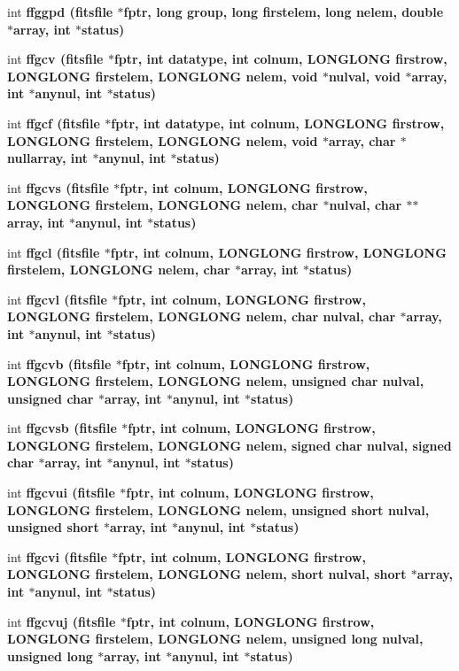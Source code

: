 \begin{CompactItemize}
\item 
int \bf{ffggpd} (\bf{fitsfile} $\ast$fptr, long group, long firstelem, long nelem, double $\ast$array, int $\ast$status)
\item 
int \bf{ffgcv} (\bf{fitsfile} $\ast$fptr, int \bf{datatype}, int colnum, \bf{LONGLONG} firstrow, \bf{LONGLONG} firstelem, \bf{LONGLONG} nelem, void $\ast$nulval, void $\ast$array, int $\ast$anynul, int $\ast$status)
\item 
int \bf{ffgcf} (\bf{fitsfile} $\ast$fptr, int \bf{datatype}, int colnum, \bf{LONGLONG} firstrow, \bf{LONGLONG} firstelem, \bf{LONGLONG} nelem, void $\ast$array, char $\ast$nullarray, int $\ast$anynul, int $\ast$status)
\item 
int \bf{ffgcvs} (\bf{fitsfile} $\ast$fptr, int colnum, \bf{LONGLONG} firstrow, \bf{LONGLONG} firstelem, \bf{LONGLONG} nelem, char $\ast$nulval, char $\ast$$\ast$array, int $\ast$anynul, int $\ast$status)
\item 
int \bf{ffgcl} (\bf{fitsfile} $\ast$fptr, int colnum, \bf{LONGLONG} firstrow, \bf{LONGLONG} firstelem, \bf{LONGLONG} nelem, char $\ast$array, int $\ast$status)
\item 
int \bf{ffgcvl} (\bf{fitsfile} $\ast$fptr, int colnum, \bf{LONGLONG} firstrow, \bf{LONGLONG} firstelem, \bf{LONGLONG} nelem, char nulval, char $\ast$array, int $\ast$anynul, int $\ast$status)
\item 
int \bf{ffgcvb} (\bf{fitsfile} $\ast$fptr, int colnum, \bf{LONGLONG} firstrow, \bf{LONGLONG} firstelem, \bf{LONGLONG} nelem, unsigned char nulval, unsigned char $\ast$array, int $\ast$anynul, int $\ast$status)
\item 
int \bf{ffgcvsb} (\bf{fitsfile} $\ast$fptr, int colnum, \bf{LONGLONG} firstrow, \bf{LONGLONG} firstelem, \bf{LONGLONG} nelem, signed char nulval, signed char $\ast$array, int $\ast$anynul, int $\ast$status)
\item 
int \bf{ffgcvui} (\bf{fitsfile} $\ast$fptr, int colnum, \bf{LONGLONG} firstrow, \bf{LONGLONG} firstelem, \bf{LONGLONG} nelem, unsigned short nulval, unsigned short $\ast$array, int $\ast$anynul, int $\ast$status)
\item 
int \bf{ffgcvi} (\bf{fitsfile} $\ast$fptr, int colnum, \bf{LONGLONG} firstrow, \bf{LONGLONG} firstelem, \bf{LONGLONG} nelem, short nulval, short $\ast$array, int $\ast$anynul, int $\ast$status)
\item 
int \bf{ffgcvuj} (\bf{fitsfile} $\ast$fptr, int colnum, \bf{LONGLONG} firstrow, \bf{LONGLONG} firstelem, \bf{LONGLONG} nelem, unsigned long nulval, unsigned long $\ast$array, int $\ast$anynul, int $\ast$status)
$$
\end{CompactItemize}
